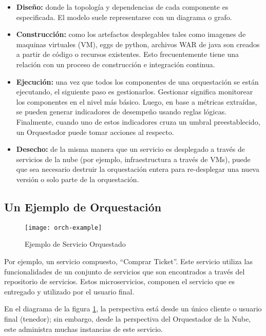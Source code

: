         \begin{itemize} 
        \item \textbf{Diseño: }donde la topología y dependencias de cada componente es especificada. El modelo suele representarse con un diagrama o grafo.
        
        \item \textbf{Construcción: }como los artefactos desplegables tales como imagenes de maquinas virtuales (VM), eggs de python, archivos WAR de java son creados a partir de código o recursos existentes. Esto frecuentemente tiene una relación con un proceso de construcción e integración continua.
        
        \item \textbf{Ejecución: }una vez que todos los componentes de una orquestación se están ejecutando, el siguiente paso es gestionarlos. Gestionar significa monitorear los componentes en el nivel más básico. Luego, en base a métricas extraídas, se pueden generar indicadores de desempeño usando reglas lógicas. Finalmente, cuando uno de estos indicadores cruza un umbral preestablecido, un Orquestador puede tomar acciones al respecto.
        
        \item \textbf{Desecho: }de la misma manera que un servicio es desplegado a través de servicios de la nube (por ejemplo, infraestructura a través de VMs), puede que sea necesario destruir la orquestación entera para re-desplegar una nueva versión o solo parte de la orquestación. 
        \end{itemize}

        \subsection{Un Ejemplo de Orquestación}
        \begin{figure}[H]
            \centering
            \texttt{[image: orch-example]}
            \caption{Ejemplo de Servicio Orquestado}
            \label{fig:orch-example}
        \end{figure}
        Por ejemplo, un servicio compuesto, “Comprar Ticket”. Este servicio utiliza las funcionalidades de un conjunto de servicios que son encontrados a través del repositorio de servicios. Estos microservicios, componen el servicio que es entregado y utilizado por el usuario final. 
        
        En el diagrama de la figura \ref{fig:orch-example}, la perspectiva está desde un único cliente o usuario final (tenedor); sin embargo, desde la perspectiva del Orquestador de la Nube, este administra muchas instancias de este servicio. 
        
